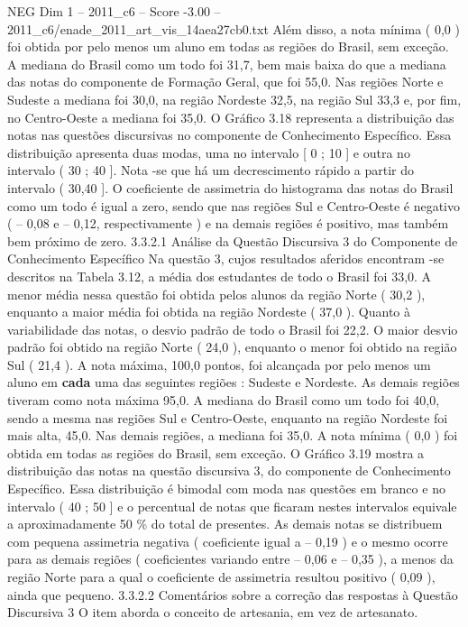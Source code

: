 \begin{textsample}{NEG Dim 1 – 2011\_c6 – Score -3.00 – 2011\_c6/enade\_2011\_art\_vis\_14aea27cb0.txt}
Além disso, a nota mínima ( 0,0 ) foi obtida por pelo menos um aluno em todas as regiões do Brasil, sem exceção.
A mediana do Brasil como um todo foi 31,7, bem mais baixa do que a mediana das notas do componente de Formação Geral, que foi 55,0.
Nas regiões Norte e Sudeste a mediana foi 30,0, na região Nordeste 32,5, na região Sul 33,3 e, por fim, no Centro-Oeste a mediana foi 35,0.
O Gráfico 3.18 representa a distribuição das notas nas questões discursivas no componente de Conhecimento Específico.
Essa distribuição apresenta duas modas, uma no intervalo [ 0 ; 10 ] e outra no intervalo ( 30 ; 40 ].
Nota -se que há um decrescimento rápido a partir do intervalo ( 30,40 ].
O coeficiente de assimetria do histograma das notas do Brasil como um todo é igual a zero, sendo que nas regiões Sul e Centro-Oeste é negativo ( – 0,08 e – 0,12, respectivamente ) e na demais regiões é positivo, mas também bem próximo de zero. 3.3.2.1 Análise da Questão Discursiva 3 do Componente de Conhecimento Específico Na questão 3, cujos resultados aferidos encontram -se descritos na Tabela 3.12, a média dos estudantes de todo o Brasil foi 33,0.
A menor média nessa questão foi obtida pelos alunos da região Norte ( 30,2 ), enquanto a maior média foi obtida na região Nordeste ( 37,0 ).
Quanto à variabilidade das notas, o desvio padrão de todo o Brasil foi 22,2.
O maior desvio padrão foi obtido na região Norte ( 24,0 ), enquanto o menor foi obtido na região Sul ( 21,4 ).
A nota máxima, 100,0 pontos, foi alcançada por pelo menos um aluno em \textbf{cada} uma das seguintes regiões : Sudeste e Nordeste.
As demais regiões tiveram como nota máxima 95,0.
A mediana do Brasil como um todo foi 40,0, sendo a mesma nas regiões Sul e Centro-Oeste, enquanto na região Nordeste foi mais alta, 45,0.
Nas demais regiões, a mediana foi 35,0.
A nota mínima ( 0,0 ) foi obtida em todas as regiões do Brasil, sem exceção.
O Gráfico 3.19 mostra a distribuição das notas na questão discursiva 3, do componente de Conhecimento Específico.
Essa distribuição é bimodal com moda nas questões em branco e no intervalo ( 40 ; 50 ] e o percentual de notas que ficaram nestes intervalos equivale a aproximadamente 50 \% do total de presentes.
As demais notas se distribuem com pequena assimetria negativa ( coeficiente igual a – 0,19 ) e o mesmo ocorre para as demais regiões ( coeficientes variando entre – 0,06 e – 0,35 ), a menos da região Norte para a qual o coeficiente de assimetria resultou positivo ( 0,09 ), ainda que pequeno. 3.3.2.2 Comentários sobre a correção das respostas à Questão Discursiva 3 O item aborda o conceito de artesania, em vez de artesanato.

\end{textsample}
